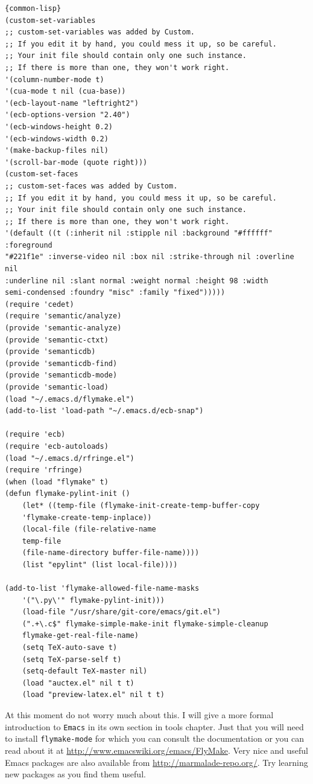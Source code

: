 \begin{Verbatim}[frame=single]{common-lisp}
(custom-set-variables
;; custom-set-variables was added by Custom.
;; If you edit it by hand, you could mess it up, so be careful.
;; Your init file should contain only one such instance.
;; If there is more than one, they won't work right.
'(column-number-mode t)
'(cua-mode t nil (cua-base))
'(ecb-layout-name "leftright2")
'(ecb-options-version "2.40")
'(ecb-windows-height 0.2)
'(ecb-windows-width 0.2)
'(make-backup-files nil)
'(scroll-bar-mode (quote right)))
(custom-set-faces
;; custom-set-faces was added by Custom.
;; If you edit it by hand, you could mess it up, so be careful.
;; Your init file should contain only one such instance.
;; If there is more than one, they won't work right.
'(default ((t (:inherit nil :stipple nil :background "#ffffff" :foreground
"#221f1e" :inverse-video nil :box nil :strike-through nil :overline nil
:underline nil :slant normal :weight normal :height 98 :width
semi-condensed :foundry "misc" :family "fixed")))))
(require 'cedet)
(require 'semantic/analyze)
(provide 'semantic-analyze)
(provide 'semantic-ctxt)
(provide 'semanticdb)
(provide 'semanticdb-find)
(provide 'semanticdb-mode)
(provide 'semantic-load)
(load "~/.emacs.d/flymake.el")
(add-to-list 'load-path "~/.emacs.d/ecb-snap")

(require 'ecb)
(require 'ecb-autoloads)
(load "~/.emacs.d/rfringe.el")
(require 'rfringe)
(when (load "flymake" t)
(defun flymake-pylint-init ()
    (let* ((temp-file (flymake-init-create-temp-buffer-copy
    'flymake-create-temp-inplace))
    (local-file (file-relative-name
    temp-file
    (file-name-directory buffer-file-name))))
    (list "epylint" (list local-file))))

(add-to-list 'flymake-allowed-file-name-masks
    '("\.py\'" flymake-pylint-init)))
    (load-file "/usr/share/git-core/emacs/git.el")
    (".+\.c$" flymake-simple-make-init flymake-simple-cleanup
    flymake-get-real-file-name)
    (setq TeX-auto-save t)
    (setq TeX-parse-self t)
    (setq-default TeX-master nil)
    (load "auctex.el" nil t t)
    (load "preview-latex.el" nil t t)
\end{Verbatim}

At this moment do not worry much about this. I will give a more formal
introduction to \texttt{Emacs} in its own section in tools chapter.
Just that you will need to install \texttt{flymake-mode} for which you can
consult the documentation or you can read about it at
\url{http://www.emacswiki.org/emacs/FlyMake}. Very nice and useful Emacs
packages are also available from \url{http://marmalade-repo.org/}. Try
learning new packages as you find them useful. 


